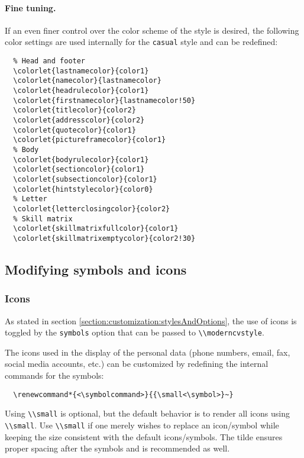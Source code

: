 \documentclass[a4paper, 11pt]{article}
\newcommand{\code}[1]{\lstinline!#1!}
\begin{document}
\paragraph{Fine tuning.}
If an even finer control over the color scheme of the style is desired, the following color settings are used internally for the \code{casual} style and can be redefined:
\begin{lstlisting}
  % Head and footer
  \colorlet{lastnamecolor}{color1}
  \colorlet{namecolor}{lastnamecolor}
  \colorlet{headrulecolor}{color1}
  \colorlet{firstnamecolor}{lastnamecolor!50}
  \colorlet{titlecolor}{color2}
  \colorlet{addresscolor}{color2}
  \colorlet{quotecolor}{color1}
  \colorlet{pictureframecolor}{color1}
  % Body
  \colorlet{bodyrulecolor}{color1}
  \colorlet{sectioncolor}{color1}
  \colorlet{subsectioncolor}{color1}
  \colorlet{hintstylecolor}{color0}
  % Letter
  \colorlet{letterclosingcolor}{color2}
  % Skill matrix
  \colorlet{skillmatrixfullcolor}{color1}
  \colorlet{skillmatrixemptycolor}{color2!30}
\end{lstlisting}


\subsection{Modifying symbols and icons}
\subsubsection{Icons}
As stated in section \ref{section:customization:stylesAndOptions}, the use of icons is toggled by the \code{symbols} option that can be passed to \code{\\moderncvstyle}.

The icons used in the display of the personal data (phone numbers, email, fax, social media accounts, etc.) can be customized by redefining the internal commands for the symbols:
\begin{lstlisting}
  \renewcommand*{<\symbolcommand>}{{\small<\symbol>}~}
\end{lstlisting}
Using \code{\\small} is optional, but the default behavior is to render all icons using \code{\\small}.
Use \code{\\small} if one merely wishes to replace an icon/symbol while keeping the size consistent with the default icons/symbols.
The tilde ensures proper spacing after the symbols and is recommended as well.
\end{document}
